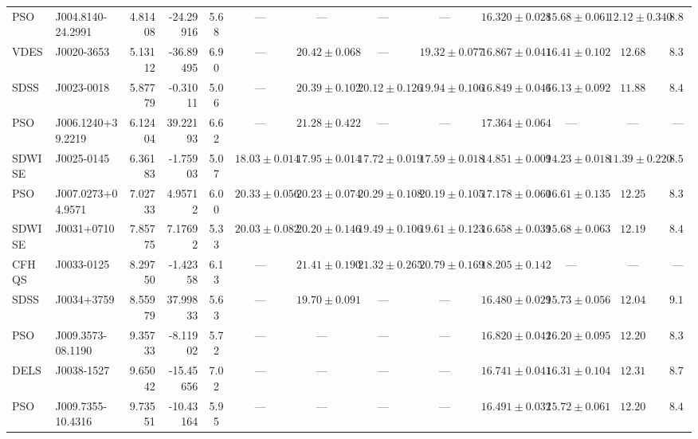 \begin{table}
\begin{tabular}{llrrc cccc cccc}
PSO & J004.8140-24.2991 &    4.81408 &  -24.29916 &  5.68   &   ---  &  ---  &  ---   & ---    &   $16.320\pm0.028$   &  $15.68\pm0.061$   &   $12.12\pm0.340$   &   $ 8.82$   \\
VDES & J0020-3653 &    5.13112 &  -36.89495 &  6.90   &   ---  &  $20.42\pm0.068$  &  ---   & $19.32\pm0.077$    &   $16.867\pm0.041$   &  $16.41\pm0.102$   &   $12.68$   &   $ 8.34$   \\
SDSS & J0023-0018 &    5.87779 &   -0.31011 &  5.06   &   ---  &  $20.39\pm0.102$  &  $20.12\pm0.126$   & $19.94\pm0.106$    &   $16.849\pm0.046$   &  $16.13\pm0.092$   &   $11.88$   &   $ 8.49$   \\
PSO & J006.1240+39.2219 &    6.12404 &   39.22193 &  6.62   &   ---  &  $21.28\pm0.422$  &  ---   & ---    &   $17.364\pm0.064$   &  ---   &   ---   &   ---   \\
SDWISE & J0025-0145 &    6.36183 &   -1.75903 &  5.07   &   $18.03\pm0.014$  &  $17.95\pm0.014$  &  $17.72\pm0.019$   & $17.59\pm0.018$    &   $14.851\pm0.009$   &  $14.23\pm0.018$   &   $11.39\pm0.220$   &   $ 8.51$   \\
PSO & J007.0273+04.9571 &    7.02733 &    4.95712 &  6.00   &   $20.33\pm0.056$  &  $20.23\pm0.074$  &  $20.29\pm0.108$   & $20.19\pm0.105$    &   $17.178\pm0.060$   &  $16.61\pm0.135$   &   $12.25$   &   $ 8.32$   \\
SDWISE & J0031+0710 &    7.85775 &    7.17692 &  5.33   &   $20.03\pm0.082$  &  $20.20\pm0.146$  &  $19.49\pm0.106$   & $19.61\pm0.123$    &   $16.658\pm0.039$   &  $15.68\pm0.063$   &   $12.19$   &   $ 8.40$   \\
CFHQS & J0033-0125 &    8.29750 &   -1.42358 &  6.13   &   ---  &  $21.41\pm0.190$  &  $21.32\pm0.265$   & $20.79\pm0.169$    &   $18.205\pm0.142$   &  ---   &   ---   &   ---   \\
SDSS & J0034+3759 &    8.55979 &   37.99833 &  5.63   &   ---  &  $19.70\pm0.091$  &  ---   & ---    &   $16.480\pm0.029$   &  $15.73\pm0.056$   &   $12.04$   &   $ 9.10$   \\
PSO & J009.3573-08.1190 &    9.35733 &   -8.11902 &  5.72   &   ---  &  ---  &  ---   & ---    &   $16.820\pm0.042$   &  $16.20\pm0.095$   &   $12.20$   &   $ 8.36$   \\
DELS & J0038-1527 &    9.65042 &  -15.45656 &  7.02   &   ---  &  ---  &  ---   & ---    &   $16.741\pm0.041$   &  $16.31\pm0.104$   &   $12.31$   &   $ 8.70$   \\
PSO & J009.7355-10.4316 &    9.73551 &  -10.43164 &  5.95   &   ---  &  ---  &  ---   & ---    &   $16.491\pm0.032$   &  $15.72\pm0.061$   &   $12.20$   &   $ 8.41$   \\

\end{tabular}
\end{table}
